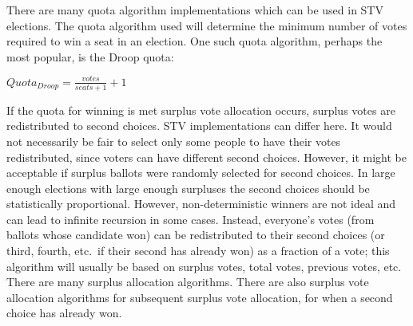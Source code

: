 There are many quota algorithm implementations which can be used in STV
elections. The quota algorithm used will determine the minimum number of votes
required to win a seat in an election. One such quota algorithm, perhaps the
most popular, is the Droop quota:\cite{electoral-handbook}
%
\begin{center}
    $Quota_{Droop} = \frac{votes}{seats+1}+1$
\end{center}
%
%
%
%
%
%
If the quota for winning is met surplus vote allocation occurs, surplus votes
are redistributed to second choices. STV implementations can differ here. It
would not necessarily be fair to select only some people to have their votes
redistributed, since voters can have different second choices. However, it might
be acceptable if surplus ballots were randomly selected for second choices. In
large enough elections with large enough surpluses the second choices should be
statistically proportional. However, non-deterministic winners are not ideal and
can lead to infinite recursion in some cases. Instead, everyone's votes (from
ballots whose candidate won) can be redistributed to their second choices (or
third, fourth, etc.\ if their second has already won) as a fraction of a vote;
this algorithm will usually be based on surplus votes, total votes, previous
votes, etc. There are many surplus allocation algorithms.\cite{electoral-handbook}
There are also surplus vote allocation algorithms for subsequent surplus vote
allocation, for when a second choice has already won.\cite{electoral-handbook,stv}

